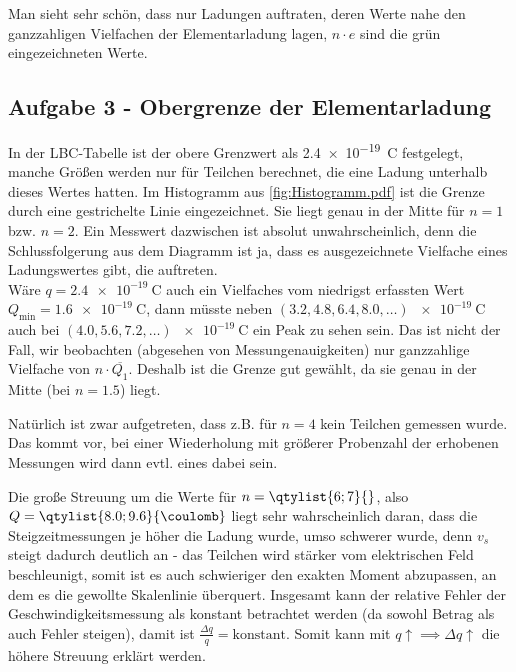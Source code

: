 
Man sieht sehr schön, dass nur Ladungen auftraten, deren Werte nahe den ganzzahligen Vielfachen der Elementarladung lagen, \(n\cdot e\) sind die grün eingezeichneten Werte.   

\subsection{Aufgabe 3 - Obergrenze der Elementarladung}
In der LBC-Tabelle ist der obere Grenzwert als \qty{2.4e-19}{\coulomb} festgelegt, manche Größen werden nur für Teilchen berechnet, die eine Ladung unterhalb dieses Wertes hatten. Im Histogramm
aus \cref{fig:Histogramm.pdf} ist die Grenze durch eine gestrichelte Linie eingezeichnet. Sie liegt
genau in der Mitte für \(n=1\) bzw. \(n=2\). Ein Messwert dazwischen ist absolut unwahrscheinlich, denn die Schlussfolgerung aus dem Diagramm ist ja, dass es ausgezeichnete Vielfache eines Ladungswertes gibt, die auftreten.\\
Wäre \(q=\qty{2.4e-19}{\coulomb}\) auch ein Vielfaches vom niedrigst erfassten Wert \(Q_{\text{min}}=\qty{1.6e-19}{\coulomb}\), dann müsste neben \((3.2,4.8,6.4,8.0,\dots )\,\qty{e-19}{\coulomb}\) auch bei
\((4.0,5.6,7.2,\dots )\,\qty{e-19}{\coulomb}\) ein Peak zu sehen sein. Das ist nicht der Fall, wir beobachten (abgesehen von Messungenauigkeiten) nur ganzzahlige Vielfache von \(n\cdot \overline{Q_1}\). Deshalb ist die Grenze gut gewählt, da sie genau in der Mitte (bei \(n=1.5\)) liegt.

Natürlich ist zwar aufgetreten, dass z.B. für \(n=4\) kein Teilchen gemessen wurde. Das kommt vor, bei einer Wiederholung mit größerer Probenzahl der erhobenen Messungen wird dann evtl. eines dabei sein. 

Die große Streuung um die Werte für \(n=\qtylist{6;7}{}\), also \(Q=\qtylist{8.0;9.6}{\coulomb}\) liegt sehr wahrscheinlich daran, dass die Steigzeitmessungen je höher die Ladung wurde, umso schwerer wurde, denn \(v_s\) steigt dadurch deutlich an - das Teilchen wird stärker vom elektrischen Feld beschleunigt, somit ist es auch schwieriger den exakten Moment abzupassen, an dem es die gewollte Skalenlinie überquert. Insgesamt kann der relative Fehler der Geschwindigkeitsmessung als konstant betrachtet werden (da sowohl Betrag als auch Fehler steigen), damit ist \(\frac{\Delta q}{q}=\text{konstant}\). Somit kann mit \(q\uparrow \implies \Delta q \uparrow\) die höhere Streuung erklärt werden. 

